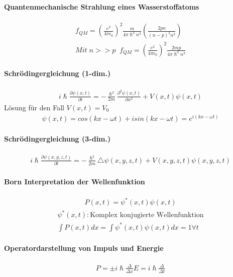 \documentclass[10pt,a4paper]{article}
\begin{document}
\paragraph{Quantenmechanische Strahlung eines Wasserstoffatoms}
\begin{align}
f_{QM}= \left(\frac{e^2}{4\pi\epsilon_0}\right)^2\frac{m}{4\pi\hslash^3 n^3}\left(\frac{2pn}{(n-p)^2n^2}\right)\\
Mit\; n>>p\;\; f_{QM}= \left(\frac{e^2}{4\pi\epsilon_0}\right)^2\frac{2mp}{4\pi\hslash^3 n^3}
\end{align}
\paragraph{Schrödingergleichung (1-dim.)}
\begin{align}
i\hslash\frac{\partial\psi(x,t)}{\partial t}= -\frac{\hslash^2}{2m}\frac{\partial^2\psi(x,t)}{\partial x^2} + V(x,t)\psi(x,t)
\end{align}
Lösung für den Fall $V(x,t)=V_0$
\begin{align}
\psi(x,t)=cos(kx-\omega t)+ isin(kx-\omega t) = e^{i(kx-\omega t)}
\end{align}
\paragraph{Schrödingergleichung (3-dim.)}
\begin{align}
i\hslash\frac{\partial\psi(x,y,z,t)}{\partial t}= -\frac{\hslash^2}{2m} \triangle\psi(x,y,z,t)+V(x,y,z,t)\psi(x,y,z,t)
\end{align}
\paragraph{Born Interpretation der Wellenfunktion}
\begin{align}
P(x,t)=\psi^*(x,t)\psi(x,t)
\end{align}
\begin{align}
\psi^*(x,t): \text{Komplex konjugierte Wellenfunktion} \\
\int P(x,t)dx = \int \psi^*(x,t)\psi(x,t) dx = 1 \forall t
\end{align}
\paragraph{Operatordarstellung von Impuls und Energie}
\begin{align}
P=\pm i\hslash \frac{\Delta}{\Delta x}
E = i\hslash \frac{\Delta}{\Delta t}
\end{align}
\end{document}
